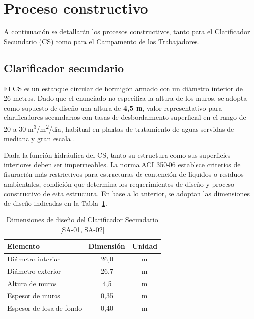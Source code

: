 \section{Proceso constructivo}

A continuación se detallarán los procesos constructivos, tanto para el Clarificador Secundario (CS) como para el Campamento de los Trabajadores.

\subsection{Clarificador secundario}

El CS es un estanque circular de hormigón armado con un diámetro interior de 26 metros. Dado que el enunciado no especifica la altura de los muros, se adopta como supuesto de diseño una altura de \textbf{4{,}5 m}, valor representativo para clarificadores secundarios con tasas de desbordamiento superficial en el rango de 20 a 30 m\textsuperscript{3}/m\textsuperscript{2}/día, habitual en plantas de tratamiento de aguas servidas de mediana y gran escala \cite{CITAR_ALTURA_MURO}.

Dada la función hidráulica del CS, tanto su estructura como sus superficies interiores deben ser impermeables. La norma ACI 350-06 \cite{ACI350} establece criterios de fisuración más restrictivos para estructuras de contención de líquidos o residuos ambientales, condición que determina los requerimientos de diseño y proceso constructivo de esta estructura. En base a lo anterior, se adoptan las dimensiones de diseño indicadas en la Tabla~\ref{tab:cs_dim}.

\begin{table}[H]
  \centering
  \caption{Dimensiones de diseño del Clarificador Secundario \textnormal{[SA-01, SA-02]}}
  \label{tab:cs_dim}
  \begin{tabular}{lcc}
    \toprule
    Elemento                 & Dimensión & Unidad \\
    \midrule
    Diámetro interior        & 26{,}0    & m \\
    Diámetro exterior        & 26{,}7    & m \\
    Altura de muros          & 4{,}5     & m \\
    Espesor de muros         & 0{,}35    & m \\
    Espesor de losa de fondo & 0{,}40    & m \\
    \bottomrule
  \end{tabular}
\end{table}

